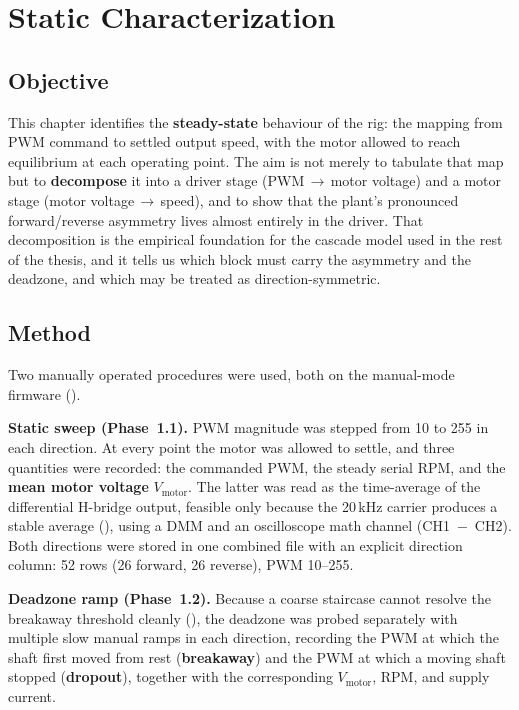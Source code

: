 \chapter{Static Characterization}
\label{chap:static}

\section{Objective}
\label{sec:static-obj}

This chapter identifies the \textbf{steady-state} behaviour of the rig: the mapping from PWM command to settled output speed, with the motor allowed to reach equilibrium at each operating point. The aim is not merely to tabulate that map but to \textbf{decompose} it into a driver stage (PWM\,$\to$\,motor voltage) and a motor stage (motor voltage\,$\to$\,speed), and to show that the plant's pronounced forward/reverse asymmetry lives almost entirely in the driver. That decomposition is the empirical foundation for the cascade model used in the rest of the thesis, and it tells us which block must carry the asymmetry and the deadzone, and which may be treated as direction-symmetric.

\section{Method}
\label{sec:static-method}

Two manually operated procedures were used, both on the manual-mode firmware ().

\textbf{Static sweep (Phase~1.1).} PWM magnitude was stepped from 10 to 255 in each direction. At every point the motor was allowed to settle, and three quantities were recorded: the commanded PWM, the steady serial RPM, and the \textbf{mean motor voltage} $V_{\mathrm{motor}}$. The latter was read as the time-average of the differential H-bridge output, feasible only because the 20\,kHz carrier produces a stable average (), using a DMM and an oscilloscope math channel (CH1~$-$~CH2). Both directions were stored in one combined file with an explicit direction column: 52 rows (26 forward, 26 reverse), PWM 10--255.

\textbf{Deadzone ramp (Phase~1.2).} Because a coarse staircase cannot resolve the breakaway threshold cleanly (), the deadzone was probed separately with multiple slow manual ramps in each direction, recording the PWM at which the shaft first moved from rest (\textbf{breakaway}) and the PWM at which a moving shaft stopped (\textbf{dropout}), together with the corresponding $V_{\mathrm{motor}}$, RPM, and supply current.

